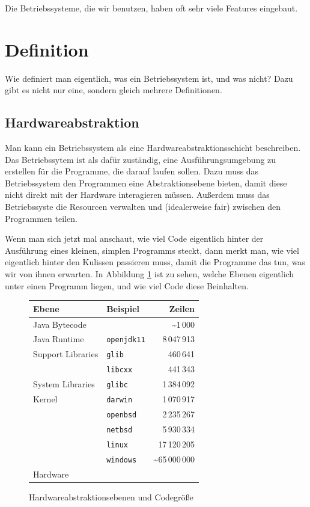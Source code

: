 \documentclass[ngerman,abstract=true]{scrartcl}
\newcommand{\tablespacing}[1]{\renewcommand{\arraystretch}{#1}}
\begin{document}
Die Betriebssysteme, die wir benutzen, haben oft sehr viele Features eingebaut. 

\section{Definition}

Wie definiert man eigentlich, was ein Betriebssystem ist, und was nicht? Dazu gibt es nicht nur eine, sondern gleich mehrere Definitionen. 

\subsection{Hardwareabstraktion}

Man kann ein Betriebssystem als eine Hardwareabstraktionsschicht beschreiben. Das Betriebssytem ist als dafür zuständig, eine Ausführungsumgebung zu erstellen für die Programme, die darauf laufen sollen. Dazu muss das Betriebssystem den Programmen eine Abstraktionsebene bieten, damit diese nicht direkt mit der Hardware interagieren müssen. Außerdem muss das Betriebssyste die Resourcen verwalten und (idealerweise fair) zwischen den Programmen teilen.

Wenn man sich jetzt mal anschaut, wie viel Code eigentlich hinter der Ausführung eines kleinen, simplen Programms steckt, dann merkt man, wie viel eigentlich hinter den Kulissen passieren muss, damit die Programme das tun, was wir von ihnen erwarten. In Abbildung \ref{fig:hardwareabstraktion} ist zu sehen, welche Ebenen eigentlich unter einen Programm liegen, und wie viel Code diese Beinhalten.
\begin{figure}[!h]\centering\tablespacing{1.4}
\begin{tabular}{@{}p{3.4cm}p{2.6cm}r@{}}
\toprule
\textbf{Ebene} & \textbf{Beispiel} & \textbf{Zeilen}\\
\midrule
Java Bytecode 
  & & \textasciitilde 1\,000\\
Java Runtime 
  & \verb|openjdk11| & 8\,047\,913\\
Support Libraries 
  & \verb|glib| & 460\,641\\
  & \verb|libcxx| & 441\,343\\
System Libraries 
  & \verb|glibc| & 1\,384\,092\\
Kernel 
  & \verb|darwin| & 1\,070\,917\\
  & \verb|openbsd| & 2\,235\,267\\
  & \verb|netbsd| & 5\,930\,334\\
  & \verb|linux| & 17\,120\,205\\
  & \verb|windows| & \textasciitilde 65\,000\,000\\
Hardware &&\\
\bottomrule 
\end{tabular}
\caption{Hardwareabstraktionsebenen und Codegröße}\label{fig:hardwareabstraktion}
\end{figure}
\end{document}

